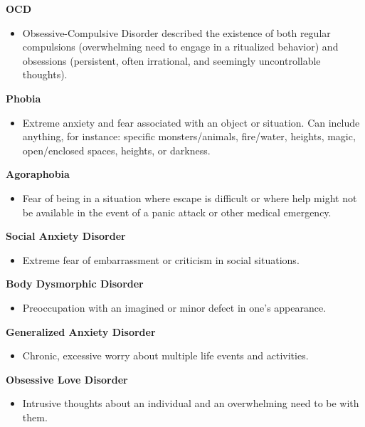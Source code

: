 \textbf{OCD}

\begin{itemize}
\tightlist
\item
  Obsessive-Compulsive Disorder described the existence of both regular
  compulsions (overwhelming need to engage in a ritualized behavior) and
  obsessions (persistent, often irrational, and seemingly uncontrollable
  thoughts).
\end{itemize}

\textbf{Phobia}

\begin{itemize}
\tightlist
\item
  Extreme anxiety and fear associated with an object or situation. Can
  include anything, for instance: specific monsters/animals, fire/water,
  heights, magic, open/enclosed spaces, heights, or darkness.
\end{itemize}

\textbf{Agoraphobia}

\begin{itemize}
\tightlist
\item
  Fear of being in a situation where escape is difficult or where help
  might not be available in the event of a panic attack or other medical
  emergency.
\end{itemize}

\textbf{Social Anxiety Disorder}

\begin{itemize}
\tightlist
\item
  Extreme fear of embarrassment or criticism in social situations.
\end{itemize}

\textbf{Body Dysmorphic Disorder}

\begin{itemize}
\tightlist
\item
  Preoccupation with an imagined or minor defect in one's appearance.
\end{itemize}

\textbf{Generalized Anxiety Disorder}

\begin{itemize}
\tightlist
\item
  Chronic, excessive worry about multiple life events and activities.
\end{itemize}

\textbf{Obsessive Love Disorder}

\begin{itemize}
\tightlist
\item
  Intrusive thoughts about an individual and an overwhelming need to be
  with them.
\end{itemize}

